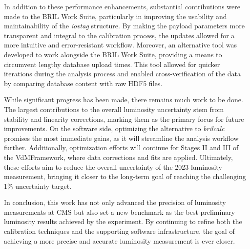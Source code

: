 In addition to these performance enhancements, substantial contributions were made to the BRIL Work Suite, particularly in improving the usability and maintainability of the \textit{iovtag} structure. By making the payload parameters more transparent and integral to the calibration process, the updates allowed for a more intuitive and error-resistant workflow. Moreover, an alternative tool was developed to work alongside the BRIL Work Suite, providing a means to circumvent lengthy database upload times. This tool allowed for quicker iterations during the analysis process and enabled cross-verification of the data by comparing database content with raw HDF5 files.

While significant progress has been made, there remains much work to be done. The largest contributions to the overall luminosity uncertainty stem from stability and linearity corrections, marking them as the primary focus for future improvements. On the software side, optimizing the alternative to \textit{brilcalc} promises the most immediate gains, as it will streamline the analysis workflow further. Additionally, optimization efforts will continue for Stages II and III of the VdMFramework, where data corrections and fits are applied. Ultimately, these efforts aim to reduce the overall uncertainty of the 2023 luminosity measurement, bringing it closer to the long-term goal of reaching the challenging 1\% uncertainty target.

In conclusion, this work has not only advanced the precision of luminosity measurements at CMS but also set a new benchmark as the best preliminary luminosity results achieved by the experiment. By continuing to refine both the calibration techniques and the supporting software infrastructure, the goal of achieving a more precise and accurate luminosity measurement is ever closer.
